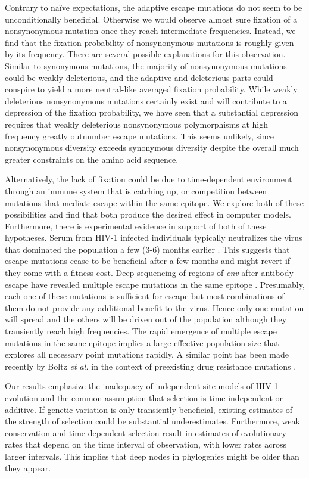 \documentclass[rmp, twocolumn]{revtex4}
\newcommand{\env}{\textit{env}}
\begin{document}
Contrary to na\"ive expectations, the adaptive escape mutations do not seem to
be unconditionally beneficial. Otherwise we would observe almost sure fixation
of a nonsynonymous mutation once they reach intermediate frequencies. Instead, we
find that the fixation probability of nonsynonymous mutations is roughly given
by its frequency. There are several possible explanations for this observation.
Similar to synonymous mutations, the majority of nonsynonymous mutations could
be weakly deleterious, and the adaptive and deleterious parts could conspire to yield a
more neutral-like averaged fixation probability. While weakly deleterious 
nonsynonymous mutations certainly exist and will contribute to a depression of the
fixation probability, we have seen that a substantial depression requires that
weakly deleterious nonsynonymous polymorphisms at high frequency greatly 
outnumber escape mutations. This seems unlikely, since nonsynonymous diversity
exceeds synonymous diversity despite the overall much greater constraints on
the amino acid sequence. 

Alternatively, the lack of fixation could be due to time-dependent environment
through an immune system that is catching up, or competition between mutations
that mediate escape within the same epitope. We explore both of these
possibilities and find that both produce the desired effect in computer models. Furthermore, there
is experimental evidence in support of both of these hypotheses. Serum from HIV-1
infected individuals typically neutralizes the virus that dominated the
population a few (3-6) months earlier \citep{richman_rapid_2003}. This suggests that
escape mutations cease to be beneficial after a few months and might revert if
they come with a fitness cost. Deep sequencing of regions of \env{} after
antibody escape have revealed multiple escape mutations in the same epitope
\citep{moore_limited_2009, bar_early_2012}. Presumably, each one of these
mutations is sufficient for escape but most combinations of them do not provide
any additional benefit to the virus. Hence only one mutation will spread and the
others will be driven out of the population although they transiently reach high
frequencies. The rapid emergence of multiple escape mutations in the same
epitope implies a large effective population size that explores all necessary point
mutations rapidly. A similar point has been made recently by Boltz {\it et al.}
in the context of preexisting drug resistance mutations
\citep{boltz_ultrasensitive_2012}. 

Our results emphasize the inadequacy of independent site models of HIV-1 evolution
and the common assumption that selection is time independent or additive. 
If genetic variation is only transiently beneficial, existing estimates of the
strength of selection \citep{neher_recombination_2010,batorsky_estimate_2011}
could be substantial underestimates. Furthermore, weak conservation and
time-dependent selection result in estimates of evolutionary 
rates that depend on the time interval of observation, with lower rates across
larger intervals. This implies that deep nodes in phylogenies might be older than 
they appear.
\end{document}
